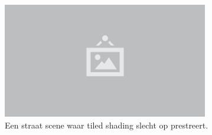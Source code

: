 \begin{figure}
  \centering
  \includegraphics[width=0.8\textwidth]{./img/raw/placeholder.png}
  \caption{Een straat scene waar tiled shading slecht op prestreert.}
  \label{fig:cs-straat}
\end{figure}
